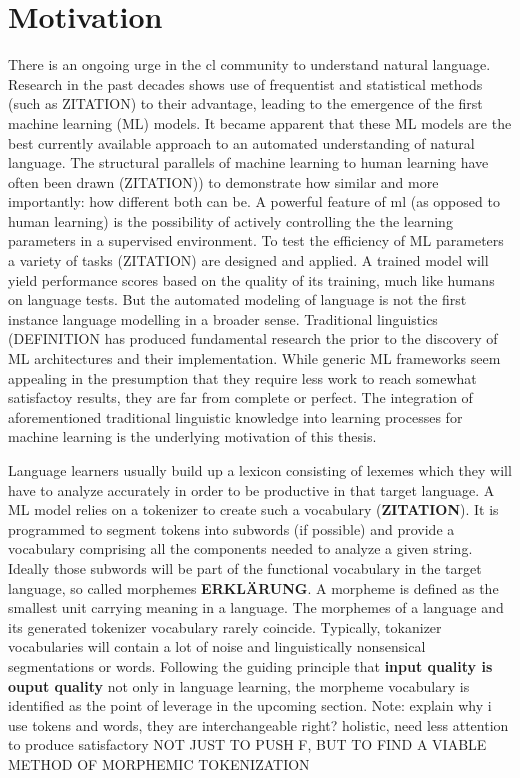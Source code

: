 \documentclass[english]{ttlab-qualify}
\begin{document}
    \section{Motivation}
    \label{sec:motivation}
    There is an ongoing urge in the \acf{cl} community to understand natural language.
    Research in the past decades shows use of frequentist and statistical methods (such as \uppercase{ZITATION}) to their advantage, leading to the emergence of the first machine learning (ML) models.
    It became apparent that these ML models are the best currently available approach to an automated understanding of natural language.
    The structural parallels of machine learning to human learning have often been drawn (\uppercase{zitation)}) to demonstrate how similar and more importantly: how different both can be.
    A powerful feature of \ac{ml} (as opposed to human learning) is the possibility of actively controlling the the learning parameters in a supervised environment.
    To test the efficiency of \uppercase{ML} parameters a variety of tasks (\uppercase{zitation}) are designed and applied.
    A trained model will yield performance scores based on the quality of its training, much like humans on language tests.
    But the automated modeling of language is not the first instance language modelling in a broader sense.
    Traditional linguistics (\uppercase{definition} has produced fundamental research the prior to the discovery of \uppercase{ML} architectures and their implementation.
    While generic ML frameworks seem appealing in the presumption that they require less work to reach somewhat satisfactoy results,
    they are far from complete or perfect.
    The integration of aforementioned traditional linguistic knowledge into learning processes for machine learning is the underlying motivation of this thesis.

    Language learners usually build up a lexicon consisting of lexemes which they will have to analyze accurately in order to be productive in that target language.
    A ML model relies on a tokenizer to create such a vocabulary  (\textbf{ZITATION}).
    It is programmed to segment tokens into subwords (if possible) and provide a vocabulary comprising all the components needed to analyze a given string.
    Ideally those subwords will be part of the functional vocabulary in the target language, so called morphemes \textbf{ERKLÄRUNG}.
    A morpheme is defined as the smallest unit carrying meaning in a language.
    The morphemes of a language and its generated tokenizer vocabulary rarely coincide.
    Typically, tokanizer vocabularies will contain a lot of noise and linguistically nonsensical segmentations or words.
    Following the guiding principle that \textbf{input quality is ouput quality} not only in language learning, the morpheme vocabulary is identified as the point of leverage in the upcoming section.
    Note: explain why i use tokens and words, they are interchangeable right?
    holistic, need less attention to produce satisfactory
    \uppercase{not just to push F, but to find a viable method of morphemic tokenization}
\end{document}
